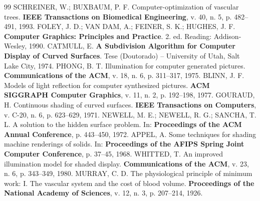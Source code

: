\documentclass[11pt, a4paper]{article}
\begin{document}
\begin{thebibliography}{99}
   SCHREINER, W.; BUXBAUM, P. F. Computer-optimization of vascular trees. \textbf{IEEE Transactions on Biomedical Engineering}, v. 40, n. 5, p. 482--491, 1993.
   FOLEY, J. D.; VAN DAM, A.; FEINER, S. K.; HUGHES, J. F. \textbf{Computer Graphics: Principles and Practice}. 2. ed. Reading: Addison-Wesley, 1990.
   CATMULL, E. \textbf{A Subdivision Algorithm for Computer Display of Curved Surfaces}. Tese (Doutorado) -- University of Utah, Salt Lake City, 1974.
   PHONG, B. T. Illumination for computer generated pictures. \textbf{Communications of the ACM}, v. 18, n. 6, p. 311--317, 1975.
   BLINN, J. F. Models of light reflection for computer synthesized pictures. \textbf{ACM SIGGRAPH Computer Graphics}, v. 11, n. 2, p. 192--198, 1977.
   GOURAUD, H. Continuous shading of curved surfaces. \textbf{IEEE Transactions on Computers}, v. C-20, n. 6, p. 623--629, 1971.
   NEWELL, M. E.; NEWELL, R. G.; SANCHA, T. L. A solution to the hidden surface problem. In: \textbf{Proceedings of the ACM Annual Conference}, p. 443--450, 1972.
   APPEL, A. Some techniques for shading machine renderings of solids. In: \textbf{Proceedings of the AFIPS Spring Joint Computer Conference}, p. 37--45, 1968.
   WHITTED, T. An improved illumination model for shaded display. \textbf{Communications of the ACM}, v. 23, n. 6, p. 343--349, 1980.
   MURRAY, C. D. The physiological principle of minimum work: I. The vascular system and the cost of blood volume. \textbf{Proceedings of the National Academy of Sciences}, v. 12, n. 3, p. 207--214, 1926.
\end{thebibliography}
\end{document}
